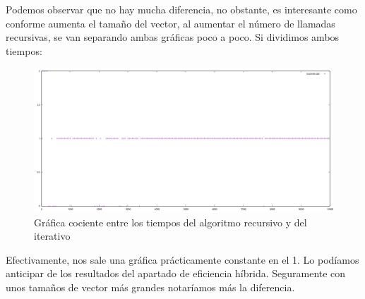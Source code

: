 \documentclass{article}
\begin{document}
	Podemos observar que no hay mucha diferencia, no obstante, es interesante como conforme aumenta el tamaño del vector, al aumentar el número de llamadas recursivas, se van separando ambas gráficas poco a poco. Si dividimos ambos tiempos:
	\begin{figure}[H]
		\centering
		\includegraphics[totalheight=6cm]{img/recursivo_entre_iterativo}
		\caption{Gráfica cociente entre los tiempos del algoritmo recursivo y del iterativo}
		\label{fig:cociente}
	\end{figure} 
	Efectivamente, nos sale una gráfica prácticamente constante en el 1. Lo podíamos anticipar de los resultados del apartado de eficiencia híbrida. Seguramente con unos tamaños de vector más grandes notaríamos más la diferencia.
\end{document}
